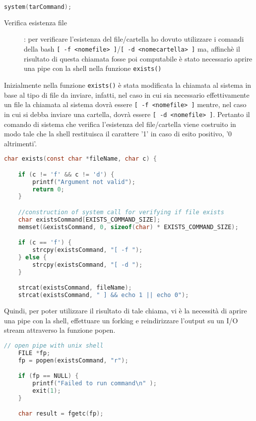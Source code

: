 \documentclass[11pt,fleqn]{book} %
\begin{document}
\begin{lstlisting}[language=C]
	system(tarCommand);
\end{lstlisting}

\begin{description}
		
	\item[Verifica esistenza file]: per verificare l'esistenza del file/cartella ho dovuto utilizzare i comandi della bash \texttt{[ -f <nomefile> 			]}/\texttt{[ -d <nomecartella> ]} ma, affinchè il risultato di questa chiamata fosse poi computabile è stato necessario aprire una pipe con la 			shell nella funzione \texttt{exists()}		
\end{description}

Inizialmente nella funzione \texttt{exists()} è stata modificata la chiamata al sistema in base al tipo di file da inviare, infatti, nel caso in cui sia necessario effettivamente un file la chiamata al sistema dovrà essere \texttt{[ -f <nomefile> ]} mentre, nel caso in cui si debba inviare una cartella, dovrà essere \texttt{[ -d <nomefile> ]}.
Pertanto il comando di sistema che verifica l'esistenza del file/cartella viene costruito in modo tale che la shell restituisca il carattere '1' in caso di esito positivo, '0 altrimenti'.
\begin{lstlisting}[language=C]
char exists(const char *fileName, char c) {

	if (c != 'f' && c != 'd') {
		printf("Argument not valid");
		return 0;
	}

	//construction of system call for verifying if file exists
	char existsCommand[EXISTS_COMMAND_SIZE];
	memset(&existsCommand, 0, sizeof(char) * EXISTS_COMMAND_SIZE);

	if (c == 'f') {
		strcpy(existsCommand, "[ -f ");
	} else {
		strcpy(existsCommand, "[ -d ");
	}

	strcat(existsCommand, fileName);
	strcat(existsCommand, " ] && echo 1 || echo 0");
\end{lstlisting}

Quindi, per poter utilizzare il risultato di tale chiama, vi è la necessità di aprire una pipe con la shell, effettuare un forking e reindirizzare l'output su un I/O stream attraverso la funzione popen.

\begin{lstlisting}[language=C]
	// open pipe with unix shell
	FILE *fp;
	fp = popen(existsCommand, "r");

	if (fp == NULL) {
    	printf("Failed to run command\n" );
    	exit(1);
  	}

  	char result = fgetc(fp);
\end{lstlisting}
\end{document}
